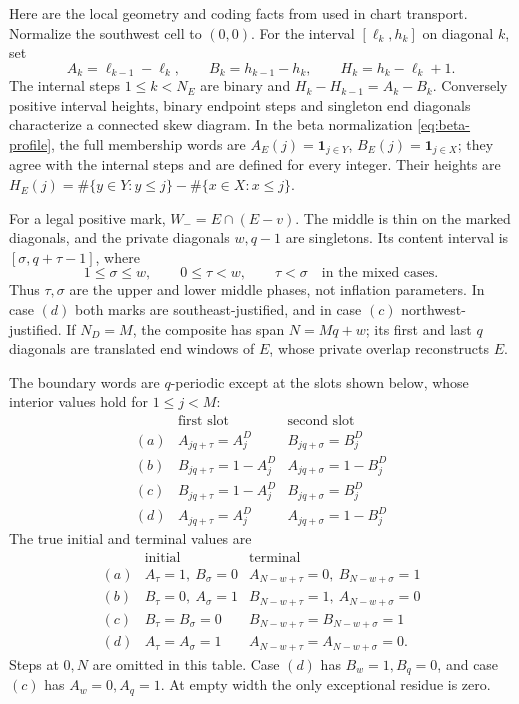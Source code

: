 \documentclass[11pt,a4paper]{amsart}
\numberwithin{equation}{section}
\theoremstyle{plain}
\theoremstyle{definition}
\begin{document}
Here are the local geometry and coding facts from
\cite[local geometry and coding lemmas]{Shields2026Gluing} used in
chart transport.  Normalize the southwest cell to \((0,0)\).
For the interval \([\ell_k,h_k]\) on diagonal \(k\), set
\[
 A_k=\ell_{k-1}-\ell_k,\qquad B_k=h_{k-1}-h_k,\qquad
 H_k=h_k-\ell_k+1.
\]
The internal steps \(1\le k<N_E\) are binary and
\(H_k-H_{k-1}=A_k-B_k\).  Conversely positive interval heights,
binary endpoint steps and singleton end diagonals characterize a
connected skew diagram.  In the beta normalization
\eqref{eq:beta-profile}, the full membership words are
\(A_E(j)=\mathbf1_{j\in Y}\), \(B_E(j)=\mathbf1_{j\in X}\);
they agree with the internal steps and are defined for every integer.
Their heights are
\(H_E(j)=\#\{y\in Y:y\le j\}-\#\{x\in X:x\le j\}\).

For a legal positive mark, \(W_-=E\cap(E-v)\).  The middle is thin
on the marked diagonals, and the private diagonals \(w,q-1\) are
singletons.  Its content interval is \([\sigma,q+\tau-1]\), where
\[
 1\le\sigma\le w,\qquad 0\le\tau<w,
 \qquad \tau<\sigma\quad\text{in the mixed cases}.
\]
Thus \(\tau,\sigma\) are the upper and lower middle phases, not
inflation parameters.  In case \((d)\) both marks are
southeast-justified, and in case \((c)\) northwest-justified.
If \(N_D=M\), the composite has span \(N=Mq+w\); its first and
last \(q\) diagonals are translated end windows of \(E\), whose
private overlap reconstructs \(E\).

The boundary words are \(q\)-periodic except at the slots shown below,
whose interior values hold for \(1\le j<M\):
\[
 \begin{array}{c|ll}
 &\text{first slot}&\text{second slot}\\ \hline
 (a)&A_{jq+\tau}=A_j^D&B_{jq+\sigma}=B_j^D\\
 (b)&B_{jq+\tau}=1-A_j^D&A_{jq+\sigma}=1-B_j^D\\
 (c)&B_{jq+\tau}=1-A_j^D&B_{jq+\sigma}=B_j^D\\
 (d)&A_{jq+\tau}=A_j^D&A_{jq+\sigma}=1-B_j^D
 \end{array}
\]
The true initial and terminal values are
\[
 \begin{array}{c|l|l}
 &\text{initial}&\text{terminal}\\ \hline
 (a)&A_\tau=1,\ B_\sigma=0&A_{N-w+\tau}=0,\ B_{N-w+\sigma}=1\\
 (b)&B_\tau=0,\ A_\sigma=1&B_{N-w+\tau}=1,\ A_{N-w+\sigma}=0\\
 (c)&B_\tau=B_\sigma=0&B_{N-w+\tau}=B_{N-w+\sigma}=1\\
 (d)&A_\tau=A_\sigma=1&A_{N-w+\tau}=A_{N-w+\sigma}=0.
 \end{array}
\]
Steps at \(0,N\) are omitted in this table.  Case \((d)\) has
\(B_w=1,B_q=0\), and case \((c)\) has \(A_w=0,A_q=1\).
At empty width the only exceptional residue is zero.
\end{document}
